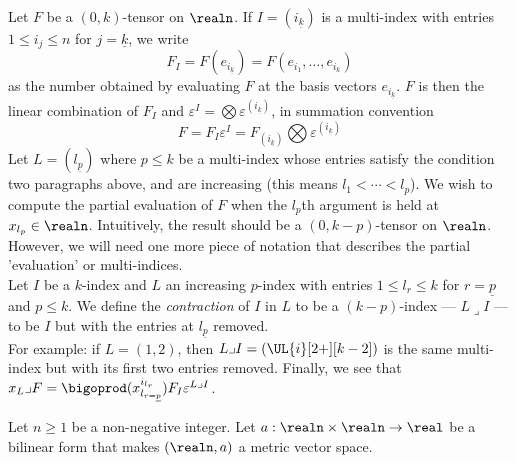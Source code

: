 \documentclass[../main-v2-manifolds.tex]{subfiles}
\begin{document}
\begin{example}
    Let $F$ be a $(0,k)$-tensor on $\realn$. If $I=(i_{\underline{k}})$ is a multi-index with entries $1\leq i_j\leq n$ for $j = \underline{k}$, we write 
    \[
        F_I = F(e_{i_{\underline{k}}}) = F(e_{i_1},\ldots, e_{i_k})
    \]
    as the number obtained by evaluating $F$ at the basis vectors $e_{i_{\underline{k}}}$. $F$ is then the linear combination of $F_I$ and $\varepsilon^I = \bigotimes\varepsilon^{(i_{\underline{k}})}$, in summation convention
    \[
        F = F_I\varepsilon^I = F_{(i_{\underline{k}})}\bigotimes \varepsilon^{(i_{\underline{k}})}
    \]
    Let $L = (l_{\underline{p}})$ where $p\leq k$ be a multi-index whose entries satisfy the condition two paragraphs above, and are increasing (this means $l_1<\cdots<l_p$). We wish to compute the partial evaluation of $F$ when the $l_p$th argument is held at $x_{l_p}\in\realn$. Intuitively, the result should be a $(0,k-p)$-tensor on $\realn$. However, we will need one more piece of notation that describes the partial 'evaluation' or multi-indices.\\

    Let $I$ be a $k$-index and $L$ an increasing $p$-index with entries $1\leq l_r\leq k$ for $r=\underline{p}$ and $p\leq k$. We define the \emph{contraction} of $I$ in $L$ to be a $(k-p)$-index --- $L\lrcorner I$ --- to be $I$ but with the entries at $l_{\underline{p}}$ removed. \\
    
    For example: if $L = (1,2)$, then $L\lrcorner I = (\UL{i}[2+][k-2])$ is the same multi-index but with its first two entries removed. Finally, we see that $x_L\lrcorner F = \bigoprod(x_{l_{r=\underline{p}}}^{i_{l_r}})F_{I} \varepsilon^{L\lrcorner I}$.
\end{example}
Let $n\geq 1$ be a non-negative integer. Let $a:\realn\times\realn\to\real$ be a bilinear form that makes $(\realn,a)$ a metric vector space. \\
\end{document}
